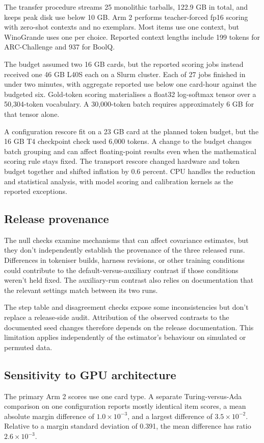 The transfer procedure streams 25 monolithic tarballs, 122.9 GB in total, and keeps peak disk use below 10 GB. Arm 2 performs teacher-forced fp16 scoring with zero-shot contexts and no exemplars. Most items use one context, but WinoGrande uses one per choice. Reported context lengths include 199 tokens for ARC-Challenge and 937 for BoolQ.

The budget assumed two 16 GB cards, but the reported scoring jobs instead received one 46 GB L40S each on a Slurm cluster. Each of 27 jobs finished in under two minutes, with aggregate reported use below one card-hour against the budgeted six. Gold-token scoring materialises a float32 log-softmax tensor over a 50,304-token vocabulary. A 30,000-token batch requires approximately 6 GB for that tensor alone.

A configuration rescore fit on a 23 GB card at the planned token budget, but the 16 GB T4 checkpoint check used 6,000 tokens. A change to the budget changes batch grouping and can affect floating-point results even when the mathematical scoring rule stays fixed. The transport rescore changed hardware and token budget together and shifted inflation by 0.6 percent. CPU handles the reduction and statistical analysis, with model scoring and calibration kernels as the reported exceptions.

\subsection{Release provenance}
The null checks examine mechanisms that can affect covariance estimates, but they don't independently establish the provenance of the three released runs. Differences in tokeniser builds, harness revisions, or other training conditions could contribute to the default-versus-auxiliary contrast if those conditions weren't held fixed. The auxiliary-run contrast also relies on documentation that the relevant settings match between its two runs.

The step table and disagreement checks expose some inconsistencies but don't replace a release-side audit. Attribution of the observed contrasts to the documented seed changes therefore depends on the release documentation. This limitation applies independently of the estimator's behaviour on simulated or permuted data.

\subsection{Sensitivity to GPU architecture}
The primary Arm 2 scores use one card type. A separate Turing-versus-Ada comparison on one configuration reports mostly identical item scores, a mean absolute margin difference of $1.0\times10^{-3}$, and a largest difference of $3.5\times10^{-2}$. Relative to a margin standard deviation of 0.391, the mean difference has ratio $2.6\times10^{-3}$.

